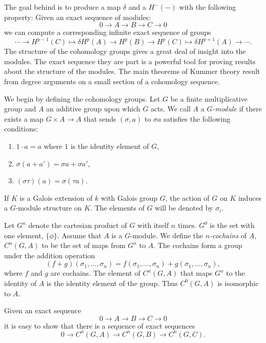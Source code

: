 \medskip 
The goal behind  is to produce a map $\delta$ and
a  $H^{-}(-)$ with the following property: Given an
exact sequence of modules:
\[
0 \longrightarrow A \longrightarrow B \longrightarrow C \longrightarrow 0
\]
we can compute a corresponding infinite exact sequence of groups
\[
 \cdots \longrightarrow H^{p-1}(C) \mapsto{\delta} H^p(A) \longrightarrow
H^p(B) \longrightarrow H^p(C) \mapsto{\delta} H^{p+1}(A)
\longrightarrow \cdots.
\]
The structure of the cohomology groups gives a great deal of insight into
the modules.  The exact sequence they are part is a powerful tool for
proving results about the structure of the modules.  The main theorems of
Kummer theory result from degree arguments on a small section of a
cohomology sequence.

We begin by defining the cohomology groups.  Let $G$ be a finite
multiplicative group and $A$ an additive group upon which $G$ acts.  We
call $A$ a {\em $G$-module} if there exists a map $G \times A \rightarrow
A$ that sends $(\sigma, a)$ to $\sigma a$ satisfies the following
conditions:

\begin{enumerate}
\item $1 \cdot a = a$ where $1$ is the identity element of $G$,
\item $\sigma(a + a') = \sigma a + \sigma a'$,
\item $(\sigma \tau)(a) = \sigma(\tau a)$.
\end{enumerate}

If $K$ is a Galois extension of $k$ with Galois group $G$, the action of
$G$ on $K$ induces a $G$-module structure on $K$.  The elements of $G$ will
be denoted by $\sigma_i$.

Let $G^n$ denote the cartesian product of $G$ with itself $n$ times.
$G^0$ is the set with one element, $\{\phi\}$.  Assume that $A$ is a
$G$-module.  We define the {\em
$n$-cochains} of $A$, $C^n(G, A)$ to be 
the set of maps from $G^n$ to $A$.  The cochains form a group under
the addition operation
\[
(f + g)(\sigma_1, \ldots, \sigma_n) = 
f(\sigma_1, \ldots, \sigma_n) + g(\sigma_1, \ldots, \sigma_n),
\]
where $f$ and $g$ are cochains.  The element of $C^n(G, A)$ that maps
$G^n$ to the identity of $A$ is the identity element of the group.  
Thus $C^0(G, A)$ is isomorphic to $A$.

Given an exact sequence 
\[
0 \longrightarrow A \longrightarrow B \longrightarrow C \longrightarrow 0
\]
it is easy to show that there is a sequence of exact sequences
\[
0 \longrightarrow C^n(G, A) \longrightarrow C^n(G, B) \longrightarrow
C^n(G, C). 
\]

